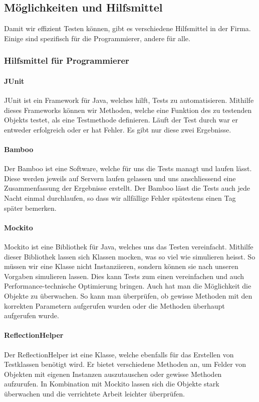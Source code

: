 \subsection{Möglichkeiten und Hilfsmittel}
Damit wir effizient Testen können, gibt es verschiedene Hilfsmittel in der Firma. Einige sind spezifisch für die Programmierer, andere für alle.
\subsubsection{Hilfsmittel für Programmierer}
\paragraph{JUnit}
JUnit ist ein Framework für Java, welches hilft, Tests zu automatisieren. Mithilfe dieses Frameworks können wir Methoden, welche eine Funktion des zu testenden Objekts testet, als eine Testmethode definieren. Läuft der Test durch war er entweder erfolgreich oder er hat Fehler. Es gibt nur diese zwei Ergebnisse.
\paragraph{Bamboo}
Der Bamboo ist eine Software, welche für uns die Tests managt und laufen lässt. Diese werden jeweils auf Servern laufen gelassen und uns anschliessend eine Zusammenfassung der Ergebnisse erstellt. Der Bamboo lässt die Tests auch jede Nacht einmal durchlaufen, so dass wir allfällige Fehler spätestens einen Tag später bemerken.
\paragraph{Mockito}
Mockito ist eine Bibliothek für Java, welches uns das Testen vereinfacht. Mithilfe dieser Bibliothek lassen sich Klassen mocken, was so viel wie simulieren heisst. So müssen wir eine Klasse nicht Instanziieren, sondern können sie nach unseren Vorgaben simulieren lassen. Dies kann Tests zum einen vereinfachen und auch Performance-technische Optimierung bringen. Auch hat man die Möglichkeit die Objekte zu überwachen. So kann man überprüfen, ob gewisse Methoden mit den korrekten Parametern aufgerufen wurden oder die Methoden überhaupt aufgerufen wurde.
\paragraph{ReflectionHelper}
Der ReflectionHelper ist eine Klasse, welche ebenfalls für das Erstellen von Testklassen benötigt wird. Er bietet verschiedene Methoden an, um Felder von Objekten mit eigenen Instanzen auszutauschen oder gewisse Methoden aufzurufen. In Kombination mit Mockito lassen sich die Objekte stark überwachen und die verrichtete Arbeit leichter überprüfen.
